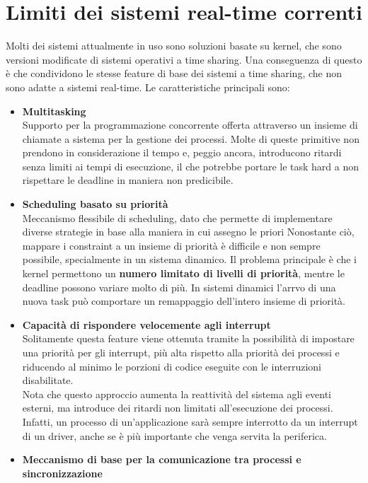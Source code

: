 \documentclass[12pt,openany,onesided]{book}
\begin{document}
\section{Limiti dei sistemi real-time correnti}
Molti dei sistemi attualmente in uso sono soluzioni basate su kernel, che sono versioni modificate di sistemi operativi a time sharing.
Una conseguenza di questo è che condividono le stesse feature di base dei sistemi a time sharing, che non sono adatte a sistemi real-time.
Le caratteristiche principali sono:
\begin{itemize}
\item \textbf{Multitasking}\\
    Supporto per la programmazione concorrente offerta attraverso un insieme di chiamate a sistema per la gestione dei processi. Molte di queste primitive
    non prendono in considerazione il tempo e, peggio ancora, introducono ritardi senza limiti ai tempi di esecuzione, il che potrebbe portare le task hard a non rispettare le deadline in maniera non predicibile.
\item \textbf{Scheduling basato su priorità}\\
    Meccanismo flessibile di scheduling, dato che permette di implementare diverse strategie in base alla maniera in cui assegno le priori
    Nonostante ciò, mappare i constraint a un insieme di priorità è difficile e non sempre possibile, specialmente in un sistema dinamico.
    Il problema principale è che i kernel permettono un \textbf{numero limitato di livelli di priorità}, mentre le deadline possono variare molto di più.
    In sistemi dinamici l'arrvo di una nuova task può comportare un remappaggio dell'intero insieme di priorità.
\item \textbf{Capacità di rispondere velocemente agli interrupt}\\
    Solitamente questa feature viene ottenuta tramite la possibilità di impostare una priorità per gli interrupt, più alta rispetto alla priorità dei processi e 
    riducendo al minimo le porzioni di codice eseguite con le interruzioni disabilitate.
    \\
    Nota che questo approccio aumenta la reattività del sistema agli eventi esterni, ma introduce dei ritardi non limitati all'esecuzione dei processi.
    Infatti, un processo di un'applicazione sarà sempre interrotto da un interrupt di un driver, anche se è più importante che venga servita la periferica.
\item \textbf{Meccanismo di base per la comunicazione tra processi e sincronizzazione}\\

\end{itemize}
\end{document}
